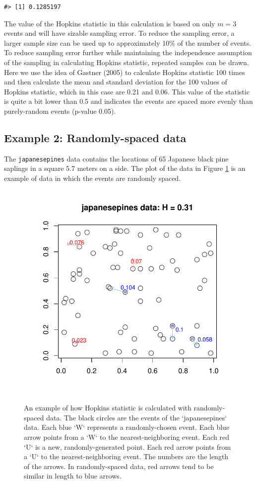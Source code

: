 \begin{verbatim}
#> [1] 0.1285197
\end{verbatim}

The value of the Hopkins statistic in this calculation is based on only \(m=3\) events and will have sizable sampling error. To reduce the sampling error, a larger sample size can be used up to approximately 10\% of the number of events. To reduce sampling error further while maintaining the independence assumption of the sampling in calculating Hopkins statistic, repeated samples can be drawn. Here we use the idea of Gastner (2005) to calculate Hopkins statistic 100 times and then calculate the mean and standard deviation for the 100 values of Hopkins statistic, which in this case are 0.21 and 0.06. This value of the statistic is quite a bit lower than 0.5 and indicates the events are spaced more evenly than purely-random events (p-value 0.05).

\hypertarget{example-2-randomly-spaced-data}{%
\subsection{Example 2: Randomly-spaced data}\label{example-2-randomly-spaced-data}}

The \texttt{japanesepines} data contains the locations of 65 Japanese black pine saplings in a square 5.7 meters on a side. The plot of the data in Figure \ref{fig:japanesepines} is an example of data in which the events are randomly spaced.

\begin{figure}

{\centering \includegraphics[width=0.6\linewidth]{RJ-2022-055_files/figure-latex/japanesepines-1} 

}

\caption{An example of how Hopkins statistic is calculated with randomly-spaced data. The black circles are the events of the `japanesepines` data. Each blue `W` represents a randomly-chosen event. Each blue arrow points from a `W` to the nearest-neighboring event. Each red `U` is a new, randomly-generated point. Each red arrow points from a `U` to the nearest-neighboring event. The numbers are the length of the arrows. In randomly-spaced data, red arrows tend to be similar in length to blue arrows.}\label{fig:japanesepines}
\end{figure}

